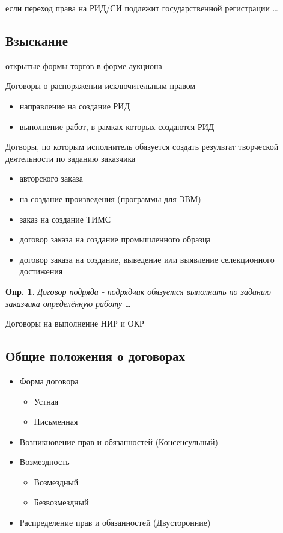 \documentclass[12pt]{article}
\newtheorem{definition}{Опр.}
\begin{document}
если переход права на РИД/СИ подлежит государственной регистрации \dots

\subsection{Взыскание}

открытые формы торгов в форме аукциона

Договоры о распоряжении исключительным правом

\begin{itemize}
  \item направление на создание РИД
  \item выполнение работ, в рамках которых создаются РИД
\end{itemize}

Догворы, по которым исполнитель обязуется создать результат творческой деятельности по заданию заказчика
\begin{itemize}
  \item авторского заказа
  \item на создание произведения (программы для ЭВМ)
  \item заказ на создание ТИМС
  \item договор заказа на создание промышленного образца
  \item договор заказа на создание, выведение или выявление селекционного достижения
\end{itemize}

\begin{definition}
  Договор подряда - подрядчик обязуется выполнить по заданию заказчика определённую работу \dots
\end{definition}

Договоры на выполнение НИР и ОКР

\subsection{Общие положения о договорах}
\begin{itemize}
  \item Форма договора
  \begin{itemize}
    \item Устная
    \item Письменная
  \end{itemize}
  \item Возникновение прав и обязанностей (Консенсульный)
  \item Возмездность
  \begin{itemize}
    \item Возмездный
    \item Безвозмездный
  \end{itemize}
  \item Распределение прав и обязанностей (Двусторонние)
\end{itemize}
\end{document}
